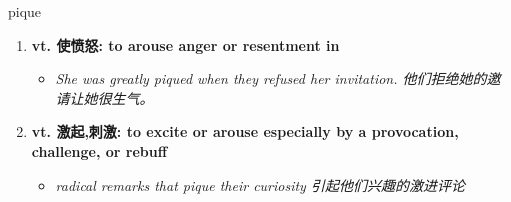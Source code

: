 
\begin{frame}
{\huge pique}
\begin{center}
\begin{enumerate}\Large
  \item \textbf{vt. 使愤怒: to arouse anger or resentment in}
  \begin{itemize}
    \item \em{\Large{She was greatly piqued when they refused her invitation. 他们拒绝她的邀请让她很生气。}}
  \end{itemize}
  \item \textbf{vt. 激起,刺激: to excite or arouse especially by a provocation, challenge, or rebuff}
  \begin{itemize}
    \item \em{\Large{radical remarks that pique their curiosity 引起他们兴趣的激进评论}}
  \end{itemize}
\end{enumerate}
\end{center}
\end{frame}

